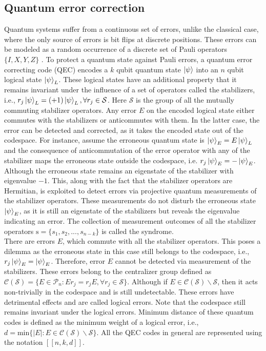 \documentclass[%
 reprint,
 amsmath,amssymb,
 aps,
pra,
showkeys,
]{revtex4-2}
\begin{document}
\subsection{Quantum error correction}
Quantum systems suffer from a continuous set of errors, unlike the classical case, where the only source of errors is bit flips at discrete positions.
These errors can be modeled as a random occurrence of a discrete set of Pauli operators $\{I, X, Y, Z\}$ \cite{knill1997theory}.
To protect a quantum state against Pauli errors, a quantum error correcting code (QEC) encodes a $k$ qubit quantum state $\ket{\psi}$ into an $n$ qubit logical state $\ket{\psi}_L$.
These logical states have an additional property that it remains invariant under the influence of a set of operators called the stabilizers, i.e., $r_j \ket{\psi}_L = (+1)\ket{\psi}_L, \forall r_j \in \mathcal{S}$.
Here $\mathcal{S}$ is the group of all the mutually commuting stabilizer operators.
Any error $E$ on the encoded logical state either commutes with the stabilizers or anticommutes with them.
In the latter case, the error can be detected and corrected, as it takes the encoded state out of the codespace.
For instance, assume the erroneous quantum state is $\ket{\psi}_E = E \ket{\psi}_L$ and the consequence of anticommutation of the error operator with any of the stabilizer maps the erroneous state outside the codespace, i.e. $r_j \ket{\psi}_E = -\ket{\psi}_E$.
Although the erroneous state remains an eigenstate of the stabilizer with eigenvalue $-1$.
This, along with the fact that the stabilizer operators are Hermitian, is exploited to detect errors via projective quantum measurements of the stabilizer operators.
These measurements do not disturb the erroneous state $\ket{\psi}_E$, as it is still an eigenstate of the stabilizers but reveals the eigenvalue indicating an error.
The collection of measurement outcomes of all the stabilizer operators $\mathrm{s} = \{s_1, s_2, ..., s_{n-k}\}$ is called the syndrome.
\\
There are errors $E$, which commute with all the stabilizer operators.
This poses a dilemma as the erroneous state in this case still belongs to the codespace, i.e., $r_j \ket{\psi}_E = \ket{\psi}_E$.
Therefore, error $E$ cannot be detected via measurement of the stabilizers.
These errors belong to the centralizer group defined as $\mathcal{C}(\mathcal{S}) = \{E \in \mathcal{P}_n : Er_j = r_jE, \forall r_j \in \mathcal{S}\}$.
Although if $E \in \mathcal{C}(\mathcal{S}) \backslash \mathcal{S}$, then it acts non-trivially in the codespace and is still undetectable.
These errors have detrimental effects and are called logical errors.
Note that the codespace still remains invariant under the logical errors.
Minimum distance of these quantum codes is defined as the minimum weight of a logical error, i.e., $d = \text{min}\{|E|: E \in \mathcal{C}(\mathcal{S}) \backslash \mathcal{S}\}$.
All the QEC codes in general are represented using the notation $[[n,k,d]]$.
\end{document}
